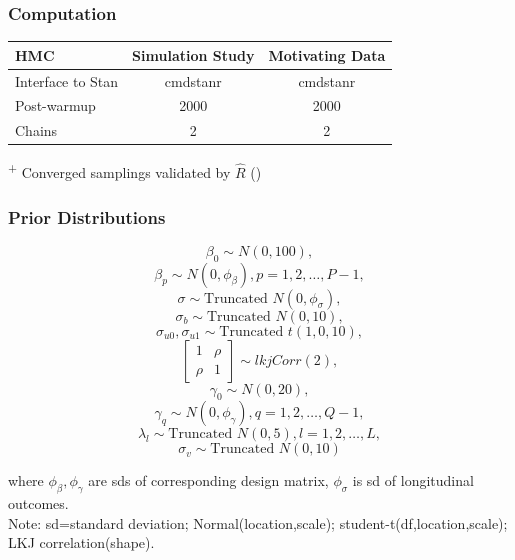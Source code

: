 \documentclass[fleqn]{beamer}
\begin{document}
\begin{frame}
\frametitle{Computation}
\footnotesize
\begin{table}[H]
\begin{threeparttable}
 \begin{tabular}{lcc}
    \toprule
 HMC & Simulation Study & Motivating Data \\
 \midrule 
 Interface to Stan & cmdstanr & cmdstanr \\
 Post-warmup\tnote{+} & 2000 & 2000 \\
 Chains & 2 & 2\\
    \bottomrule
  \end{tabular}
  \begin{tablenotes}
  \item[\textsuperscript{+}] \tiny Converged samplings validated by $\widehat{R}$ (\cite{Gelman1992})
  \end{tablenotes}
\end{threeparttable}
\end{table}
\end{frame}


\begin{frame}
\frametitle{Prior Distributions}
\scriptsize
$$\beta_0 \sim N(0,100),$$
$$\beta_p \sim N(0,\phi_\beta), p=1,2,\dots,P-1,$$
$$\sigma \sim \mbox{Truncated } N(0,\phi_\sigma),$$
$$\sigma_b \sim \mbox{Truncated } N(0,10),$$
$$\sigma_{u0}, \sigma_{u1} \sim \mbox{Truncated } t(1,0,10),$$
$$
\begin{bmatrix}
1 & \rho \\
\rho & 1
\end{bmatrix}  \sim lkjCorr(2), $$
$$\gamma_0 \sim N(0,20),$$
$$\gamma_q \sim N(0,\phi_\gamma), q=1,2,\dots, Q-1,$$
$$\lambda_l \sim \mbox{Truncated } N(0,5), l=1,2,\dots,L,$$
$$\sigma_v \sim \mbox{Truncated } N(0,10)$$

where $\phi_\beta,\phi_\gamma$ are sds of corresponding design matrix, $\phi_\sigma$ is sd of longitudinal outcomes. \\
\tiny
Note: sd=standard deviation; Normal(location,scale); student-t(df,location,scale); LKJ correlation(shape). 


\end{frame}
\end{document}

